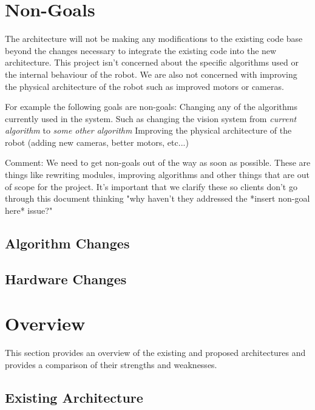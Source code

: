 \documentclass[english,12pt]{scrartcl}
\begin{document}
    \section{Non-Goals}
        The architecture will not be making any modifications to the existing code base beyond the
        changes necessary to integrate the existing code into the new architecture. This project
        isn't concerned about the specific algorithms used or the internal behaviour of the robot.
        We are also not concerned with improving the physical architecture of the robot such as
        improved motors or cameras.
    
        For example the following goals are non-goals:
        Changing any of the algorithms currently used in the system. Such as changing the vision
        system from \emph{current algorithm} to \emph{some other algorithm} Improving the physical
        architecture of the robot (adding new cameras, better motors, etc...)
        
        Comment: We need to get non-goals out of the way as soon as possible. These are things like
        rewriting modules, improving algorithms and other things that are out of scope for the
        project. It's important that we clarify these so clients don't go through this document
        thinking "why haven't they addressed the *insert non-goal here* issue?"
        
        \subsection{Algorithm Changes}
            
        \subsection{Hardware Changes}
        
    \section{Overview}
        This section provides an overview of the existing and proposed architectures and provides a comparison
        of their strengths and weaknesses.
        
        \subsection{Existing Architecture} 
        
\end{document}
